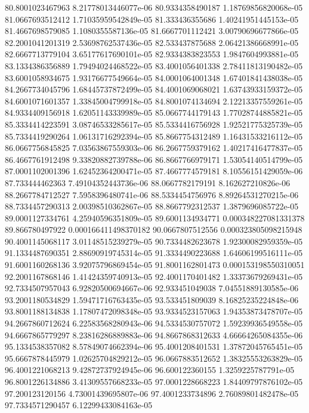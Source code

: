 {80.8001023467963 8.21778013446077e-06
80.9334358490187 1.18769856820068e-05
81.0667693512412 1.71035959542849e-05
81.333436355686 1.40241951445153e-05
81.4667698579085 1.1080355587136e-05
81.6667701112421 3.00790696677866e-05
82.2001041201319 2.53698762537436e-05
82.533437875688 2.06421386668991e-05
82.6667713779104 3.65177617690101e-05
82.9334383823553 1.9847604993881e-05
83.1334386356889 1.79494024468522e-05
83.4001056401338 2.78411813190482e-05
83.6001058934675 1.93176677549664e-05
84.0001064001348 1.67401841438038e-05
84.2667734045796 1.68445737872499e-05
84.4001069068021 1.63743933159372e-05
84.6001071601357 1.33845004799918e-05
84.8001074134694 2.12213357559261e-05
84.9334409156918 1.62051143339989e-05
85.0667744179143 1.77028744885821e-05
85.3334414223591 3.08746533285617e-05
85.5334416756928 1.92521775325739e-05
85.7334419290264 1.06131716292394e-05
85.8667754312489 1.16431533216112e-05
86.0667756845825 7.03563867559303e-06
86.2667759379162 1.40217416477837e-05
86.4667761912498 9.33820882739788e-06
86.8667766979171 1.53054140514799e-05
87.0001102001396 1.62452364200471e-05
87.4667774579181 8.10556151429059e-06
87.733444462363 7.49104352443736e-06
88.0667782179191 8.162627210826e-06
88.2667784712527 7.5958396480741e-06
88.5334454756976 8.89264531270215e-06
88.7334457290313 2.00398510362867e-05
88.8667792312537 1.3879696085722e-05
89.0001127334761 4.25940596351809e-05
89.6001134934771 0.000348227081331378
89.866780497922 0.000166411498370182
90.0667807512556 0.000323805098215948
90.4001145068117 3.01148515239279e-05
90.7334482623678 1.92300082959359e-05
91.1334487690351 2.88690919745314e-05
91.3334490223688 1.64606199516111e-05
91.6001160268136 3.92075796869454e-05
91.8001162801473 0.000153198550310051
92.2001167868146 1.41424359740913e-05
92.4001170401482 1.33373679269431e-05
92.7334507957043 6.92820500694667e-06
92.933451049038 7.04551889130585e-06
93.2001180534829 1.59471716763435e-05
93.533451809039 8.16825235224848e-06
93.8001188134838 1.17807472098348e-05
93.9334523157063 1.94353873478707e-05
94.2667860712624 6.22583568280943e-06
94.5334530757072 1.59239936549558e-05
94.6667865779297 8.23816286889883e-06
94.8667868312633 4.66664265084355e-06
95.1334538357082 8.57849074662394e-06
95.4001208401531 1.37872045765451e-05
95.6667878445979 1.02625704829212e-05
96.0667883512652 1.38325553263829e-05
96.4001221068213 9.42872737924945e-06
96.600122360155 1.3259225787791e-05
96.8001226134886 3.41309557668233e-05
97.0001228668223 1.84409797876102e-05
97.200123120156 4.73001439695807e-06
97.4001233734896 2.76089801482478e-05
97.7334571290457 6.12299433084163e-05
}
